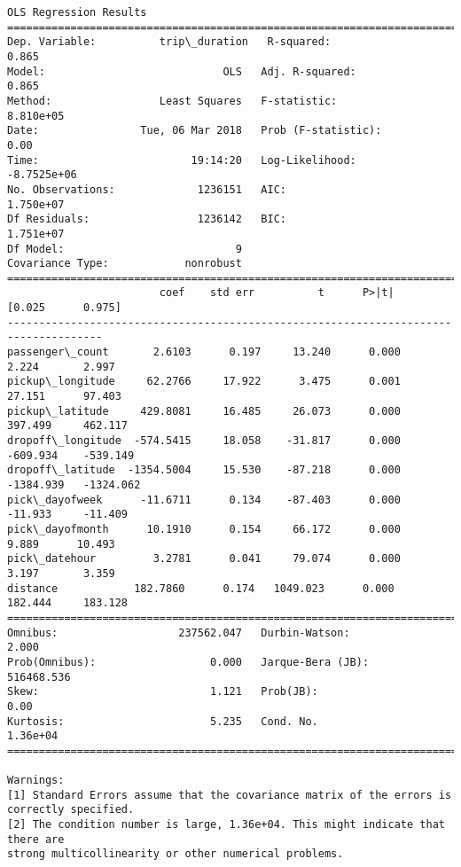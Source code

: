 \documentclass[11pt]{article}
\begin{document}
    \begin{Verbatim}[commandchars=\\\{\}]
                            OLS Regression Results                            
==============================================================================
Dep. Variable:          trip\_duration   R-squared:                       0.865
Model:                            OLS   Adj. R-squared:                  0.865
Method:                 Least Squares   F-statistic:                 8.810e+05
Date:                Tue, 06 Mar 2018   Prob (F-statistic):               0.00
Time:                        19:14:20   Log-Likelihood:            -8.7525e+06
No. Observations:             1236151   AIC:                         1.750e+07
Df Residuals:                 1236142   BIC:                         1.751e+07
Df Model:                           9                                         
Covariance Type:            nonrobust                                         
=====================================================================================
                        coef    std err          t      P>|t|      [0.025      0.975]
-------------------------------------------------------------------------------------
passenger\_count       2.6103      0.197     13.240      0.000       2.224       2.997
pickup\_longitude     62.2766     17.922      3.475      0.001      27.151      97.403
pickup\_latitude     429.8081     16.485     26.073      0.000     397.499     462.117
dropoff\_longitude  -574.5415     18.058    -31.817      0.000    -609.934    -539.149
dropoff\_latitude  -1354.5004     15.530    -87.218      0.000   -1384.939   -1324.062
pick\_dayofweek      -11.6711      0.134    -87.403      0.000     -11.933     -11.409
pick\_dayofmonth      10.1910      0.154     66.172      0.000       9.889      10.493
pick\_datehour         3.2781      0.041     79.074      0.000       3.197       3.359
distance            182.7860      0.174   1049.023      0.000     182.444     183.128
==============================================================================
Omnibus:                   237562.047   Durbin-Watson:                   2.000
Prob(Omnibus):                  0.000   Jarque-Bera (JB):           516468.536
Skew:                           1.121   Prob(JB):                         0.00
Kurtosis:                       5.235   Cond. No.                     1.36e+04
==============================================================================

Warnings:
[1] Standard Errors assume that the covariance matrix of the errors is correctly specified.
[2] The condition number is large, 1.36e+04. This might indicate that there are
strong multicollinearity or other numerical problems.

    \end{Verbatim}
\end{document}
